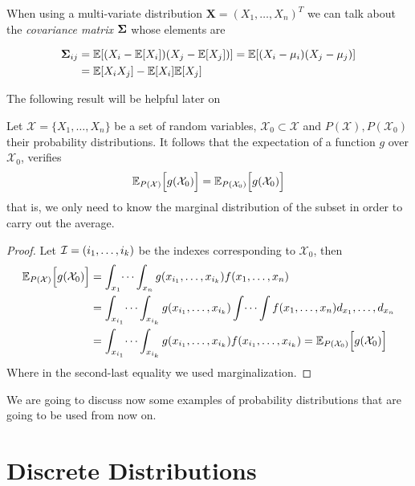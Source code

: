 When using a multi-variate distribution \(\bm{X} = (X_1,\dots,X_n)^T\) we can talk about the \emph{covariance
  matrix} \(\bm{\Sigma} \) whose elements are

\[
\begin{aligned}
\bm{\Sigma}_{ij} &= \mathbb{E}[ (X_i - \mathbb{E}[X_i])
(X_j - \mathbb{E}[X_j]) ] = \mathbb{E}[(X_i - \mu_i)(X_j - \mu_j)]\\
&=\mathbb{E}[X_i X_j]-\mathbb{E}[X_i]\mathbb{E}[X_j]
\end{aligned}
\]

The following result will be helpful later on

\begin{proposition} \label{prop:expectation_over_marginal}
  Let \(\mathcal{X} = \{X_1,\dots,X_n\}\) be a set of random variables,
  \(\mathcal{X}_{0} \subset \mathcal{X}\) and \(P(\mathcal{X}), P(\mathcal{X}_{0})\)
  their probability distributions.
  It follows that the expectation of a function \(g\) over \(\mathcal{X}_0\), verifies
    \[
      \mathbb{E}_{P(\mathcal{X})}\Big[g(\mathcal{X}_0)\Big] = \mathbb{E}_{P(\mathcal{X}_0)}\Big[g(\mathcal{X}_0)\Big]
    \]
    that is, we only need to know the marginal distribution of the subset in
    order to carry out the average.
\end{proposition}

\begin{proof}
  Let \(\mathcal{I} = (i_{1}, \dots, i_{k})\) be the indexes corresponding to \(\mathcal{X}_{0}\), then
  \[
    \begin{aligned}
      \mathbb{E}_{P(\mathcal{X})}\Big[g(\mathcal{X}_{0})\Big]&= \int_{x_{1}}\dots\int_{x_{n}}g(x_{i_{1}},\dots,x_{i_{k}})f(x_{1},\dots,x_{n}) \\
      &= \int_{x_{i_{1}}}\dots\int_{x_{i_{k}}} g(x_{i_{1}},\dots,x_{i_{k}}) \int \dots \int f(x_{1},\dots,x_{n}) d_{x_{1}},\dots,d_{x_{n}}\\
      &= \int_{x_{i_{1}}}\dots\int_{x_{i_{k}}} g(x_{i_{1}},\dots,x_{i_{k}}) f(x_{i_{1}},\dots,x_{i_{k}}) =  \mathbb{E}_{P(\mathcal{X}_{0})}\Big[g(\mathcal{X}_{0})\Big]\\
      \end{aligned}
  \]
Where in the second-last equality we used marginalization.
\end{proof}

We are going to discuss now some examples of probability distributions that are
going to be used from now on.

\section{Discrete Distributions}

